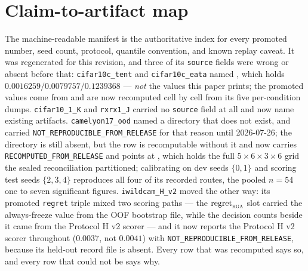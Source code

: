 \section{Claim-to-artifact map}\label{app:claim-artifact}
The machine-readable manifest  is the
authoritative index for every promoted number, seed count, protocol, quantile convention, and known
replay caveat. It was regenerated for this revision, and three of its \texttt{source} fields were
wrong or absent before that: \texttt{cifar10c\_tent} and \texttt{cifar10c\_eata} named
, which holds
$0.0016259/0.0079757/0.1239368$ --- \emph{not} the values this paper prints; the promoted values
come from  and are now recomputed cell by cell from its five
per-condition dumps. \texttt{cifar10\_1\_K} and \texttt{rxrx1\_J} carried no \texttt{source} field
at all and now name existing artifacts. \texttt{camelyon17\_ood} named a directory that does not
exist, and carried \texttt{NOT\_REPRODUCIBLE\_FROM\_RELEASE} for that reason until 2026-07-26; the
directory is still absent, but the row is recomputable without it and now carries
\texttt{RECOMPUTED\_FROM\_RELEASE} and points at
, which holds the full
$5\times6\times3\times6$ grid the sealed reconciliation partitioned; calibrating on dev seeds
$\{0,1\}$ and scoring test seeds $\{2,3,4\}$ reproduces all four of its recorded routes, the pooled
$n{=}54$ one to seven significant figures. \texttt{iwildcam\_H\_v2} moved the other way: its
promoted \texttt{regret} triple mixed two scoring paths --- the $\mathrm{regret}_{\textsc{kga}}$
slot carried the always-freeze value from the OOF bootstrap file, while the decision counts beside
it came from the Protocol H v2 scorer --- and it now reports the Protocol H v2 scorer throughout
($0.0037$, not $0.0041$) with \texttt{NOT\_REPRODUCIBLE\_FROM\_RELEASE}, because its held-out record
file is absent. Every row that was recomputed says so, and every row that could not be says why.

